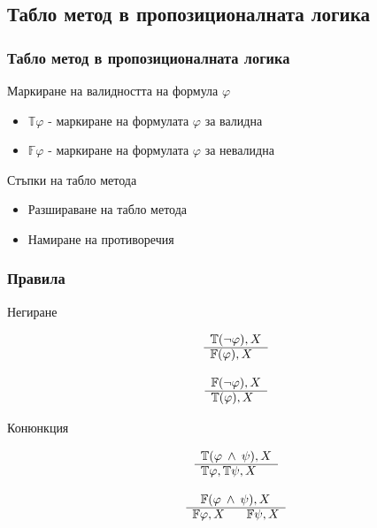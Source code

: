 \documentclass{beamer}
\newcommand{\signT}{\mathbb{T}}
\newcommand{\signF}{\mathbb{F}}
\begin{document}
\subsection{Табло метод в пропозиционалната логика}
\begin{frame}\frametitle{Табло метод в пропозиционалната логика}
Маркиране на валидността на формула $\varphi$
\begin{itemize}
	\item $\signT \varphi$ - маркиране на формулата $\varphi$ за валидна
	\item $\signF \varphi$ - маркиране на формулата $\varphi$ за невалидна
\end{itemize}
\vspace{20px}
Стъпки на табло метода
\begin{itemize}
	\item Разшираване на табло метода
	\item Намиране на противоречия
\end{itemize}
\end{frame}

\begin{frame}\frametitle{Правила}
Негиране
\vspace{20px}
		\noindent\begin{minipage}{.5\linewidth}
		\begin{align*}
			\begin{array}{rl}
				& \signT(\neg \varphi), X \\
				      \cline{2-2}
				      & \signF(\varphi), X
			\end{array}
		\end{align*}
		\end{minipage}%
		\begin{minipage}{.5\linewidth}
		\begin{align*}
			\begin{array}{rl}
				& \signF(\neg \varphi), X \\
			      \cline{2-2}
			      & \signT(\varphi), X
			\end{array}
		\end{align*}
		\end{minipage}
Конюнкция
		\noindent\begin{minipage}{.5\linewidth}
		\begin{align*}
			\begin{array}{rl}
				& \signT(\varphi \: \wedge \: \psi), X \\
			      \cline{2-2}
			      & \signT\varphi, \signT\psi, X
			\end{array}
		\end{align*}
		\end{minipage}%
		\begin{minipage}{.5\linewidth}
		\begin{align*}
			\begin{array}{rl}
				& \:\:\: \signF(\varphi \: \wedge \: \psi), X \\
			      \cline{2-2}
			      & \signF\varphi, X \:\:\:\:\:\:\:\: \signF\psi, X
			\end{array}
		\end{align*}
		\end{minipage}
\end{frame}
\end{document}
